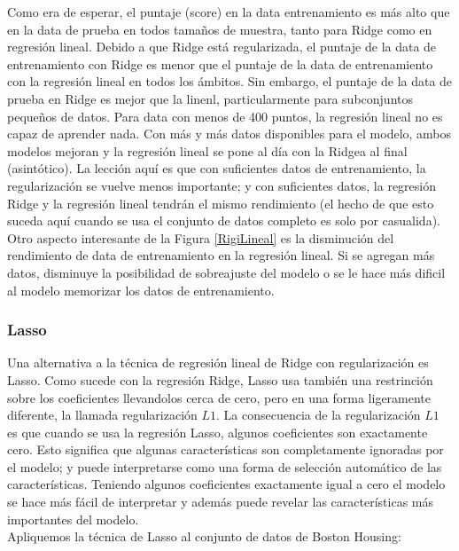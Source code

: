 {Como era de esperar, el puntaje (score)  en la data entrenamiento es más alto que en la data de prueba en todos  tamaños de muestra, tanto para Ridge como en regresión lineal.  Debido a que Ridge está regularizada, el puntaje de la data de entrenamiento con Ridge  es menor que el puntaje de la data de entrenamiento con la regresión lineal en todos los ámbitos. Sin embargo, el puntaje de la data de prueba en Ridge es mejor que la linenl, particularmente para subconjuntos  pequeños de datos. Para data con  menos de 400 puntos, la regresión lineal no es capaz de aprender nada.   Con más y  más datos  disponibles para el modelo, ambos modelos mejoran y la  regresión lineal se pone al día con la Ridgea al final (asintótico). La lección aquí es que con suficientes datos de entrenamiento, la regularización se vuelve menos importante; y con suficientes datos, la regresión Ridge  y la regresión lineal tendrán el mismo rendimiento (el hecho de que esto suceda aquí cuando se usa el conjunto de datos completo es solo por casualida). Otro aspecto interesante de la Figura \ref{RigiLineal} es la disminución del rendimiento de data de entrenamiento en la regresión lineal.  Si se agregan más datos,  disminuye la posibilidad de sobreajuste del modelo  o  se le hace más dificil al modelo memorizar los datos de entrenamiento.\\

   
\subsubsection{Lasso}

 Una alternativa a la técnica de regresión lineal de Ridge con regularización es Lasso. Como sucede con la regresión Ridge,  Lasso usa también una restrinción sobre los coeficientes 
 llevandolos  cerca de cero, pero en una forma ligeramente diferente, la llamada regularización $L1.$ La consecuencia de la regularización $L1$ es que cuando se usa la regresión Lasso, algunos coeficientes son exactamente cero. Esto significa que algunas características son  completamente  ignoradas por el modelo; y  puede  interpretarse como una forma de selección automático de las características.   Teniendo algunos coeficientes exactamente igual a cero el modelo se hace  más fácil de interpretar y además  puede revelar las características más importantes del modelo.\\
  
	Apliquemos la técnica de Lasso al conjunto de datos de Boston Housing:\\

}
